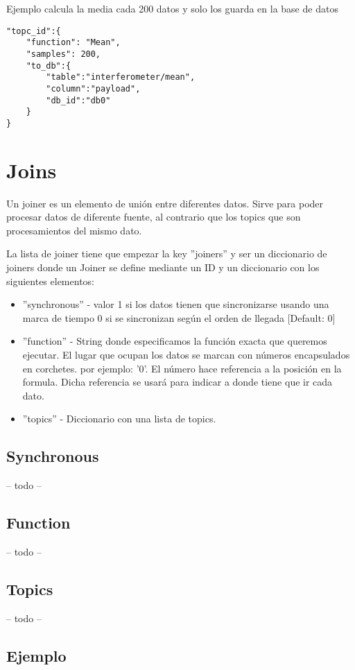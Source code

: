 \documentclass[12pt, a4paper, oneside, titlepage]{article}
\begin{document}
Ejemplo calcula la media cada 200 datos y solo los guarda en la base de datos
\begin{lstlisting}
"topc_id":{
	"function": "Mean",
	"samples": 200,
	"to_db":{
		"table":"interferometer/mean",
		"column":"payload",
		"db_id":"db0"
	}
}
\end{lstlisting}



\section{Joins}

Un joiner es un elemento de unión entre diferentes datos. Sirve para poder procesar datos de diferente fuente, al contrario que los topics que son procesamientos del mismo dato.

La lista de joiner tiene que empezar la key ''joiners'' y ser un diccionario de joiners donde un Joiner se define mediante un ID y un diccionario con los siguientes elementos:

\begin{itemize}
\item ''synchronous'' - valor 1 si los datos tienen que sincronizarse usando una marca de tiempo 0 si se sincronizan según el orden de llegada [Default: 0]
\item ''function''  - String donde especificamos la función exacta que queremos ejecutar. El lugar que ocupan los datos se marcan con números encapsulados en corchetes. por ejemplo: '{0}'. El número hace referencia a la posición en la formula. Dicha referencia se usará para indicar a donde tiene que ir cada dato.
\item ''topics'' - Diccionario con una lista de topics.

\end{itemize}

\subsection{Synchronous}
 -- todo --
\subsection{Function}
 -- todo --
\subsection{Topics}
 -- todo --

\subsection{Ejemplo}
\end{document}
